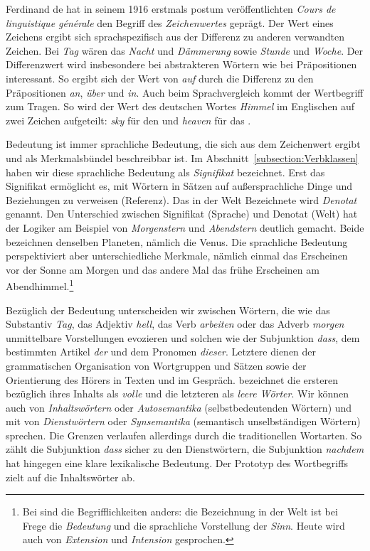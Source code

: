Ferdinand de \citet[158--160]{SaussureCLG72} hat in seinem 1916 erstmals postum veröffentlichten \textit{Cours de linguistique générale} den Begriff des \textit{Zeichenwertes} geprägt. Der Wert eines Zeichens ergibt sich sprachspezifisch aus der Differenz zu anderen verwandten Zeichen. Bei \textit{Tag} wären das \zB \textit{Nacht} und \textit{Dämmerung} sowie \textit{Stunde} und \textit{Woche}. Der Differenzwert wird insbesondere bei abstrakteren Wörtern wie bei Präpositionen interessant. So ergibt sich der Wert von \textit{auf} durch die Differenz zu den Präpositionen \textit{an}, \textit{über} und \textit{in}. Auch beim Sprachvergleich kommt der Wertbegriff zum Tragen. So wird \zB der Wert des deutschen Wortes \textit{Himmel} im Englischen auf zwei Zeichen aufgeteilt: \textit{sky} für den  und \textit{heaven} für das . 

Bedeutung ist immer sprachliche Bedeutung, die sich aus dem Zeichenwert ergibt und als Merkmalsbündel beschreibbar ist. Im Abschnitt~\ref{subsection:Verbklassen} haben wir diese sprachliche Bedeutung als \textit{Signifikat} bezeichnet. Erst das Signifikat ermöglicht es, mit Wörtern in Sätzen auf außersprachliche Dinge und Beziehungen zu verweisen (Referenz). Das in der Welt Bezeichnete wird \textit{Denotat} genannt. Den Unterschied zwischen Signifikat (Sprache) und Denotat (Welt) hat der Logiker \citet[27]{Frege1892} am Beispiel von \textit{Morgenstern} und \textit{Abendstern} deutlich gemacht. Beide bezeichnen denselben Planeten, nämlich die Venus. Die sprachliche Bedeutung perspektiviert aber unterschiedliche Merkmale, nämlich einmal das Erscheinen vor der Sonne am Morgen und das andere Mal das frühe Erscheinen am Abendhimmel.\footnote{Bei \citet{Frege1892} sind die Begrifflichkeiten anders: die Bezeichnung in der Welt ist bei Frege die \textit{Bedeutung} und die sprachliche Vorstellung der \textit{Sinn}. Heute wird auch von \textit{Extension} und \textit{Intension} gesprochen.}

Bezüglich der Bedeutung unterscheiden wir zwischen Wörtern, die wie das Substantiv \textit{Tag}, das Adjektiv \textit{hell}, das Verb \textit{arbeiten} oder das Adverb \textit{morgen} unmittelbare Vorstellungen evozieren und solchen wie der Subjunktion \textit{dass}, dem bestimmten Artikel \textit{der} und dem Pronomen \textit{dieser}. Letztere dienen der grammatischen Organisation von Wortgruppen und Sätzen sowie der Orientierung des Hörers in Texten und im Gespräch. \citet[63--70]{Tesniere1980deutsch} bezeichnet die ersteren bezüglich ihres Inhalts als \textit{volle} und die letzteren als \textit{leere Wörter}. Wir können auch von \textit{Inhaltswörtern} oder \textit{Autosemantika} (selbstbedeutenden Wörtern) und mit \citet[43]{Erben1980} von \textit{Dienstwörtern} oder \textit{Synsemantika} (semantisch unselbständigen Wörtern) sprechen. Die Grenzen verlaufen allerdings durch die traditionellen Wortarten. So zählt die Subjunktion \textit{dass} sicher zu den Dienstwörtern, die Subjunktion \textit{nachdem} hat hingegen eine klare lexikalische Bedeutung. Der Prototyp des Wortbegriffs zielt auf die Inhaltswörter ab.

